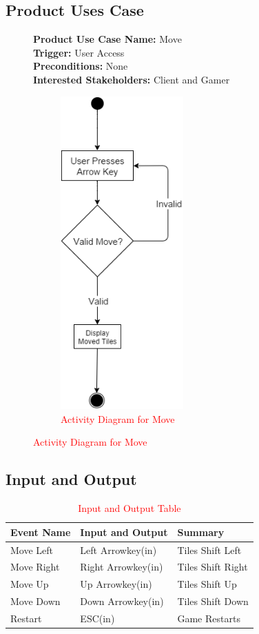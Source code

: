 \documentclass[12pt]{article}
\begin{document}
\subsection{\color{red}Product Uses Case}
\begin{figure}[H]%
    \color{red}
	\textbf{Product Use Case Name:} Move\\
	\textbf{Trigger:} User Access\\
	\textbf{Preconditions: } None\\
	\textbf{Interested Stakeholders: } Client and Gamer\\
	\begin{figure}[H]%
		\color{red}
		\centering
		\includegraphics[height = 12cm]{activity_diagram}
		\caption{\textcolor{red}{Activity Diagram for Move}}
		\label{Activity Diagram for Move}
	\end{figure}
\end{figure}

\subsection{\color{red}Input and Output}
\begin{table}[H]
    \color{red}
	\centering
	\begin{tabular}{ | p{5cm} |  p{5cm} | p{5cm} |}\hline
        \textbf{Event Name} & \textbf{Input and Output} & \textbf{Summary} \\\hline
        Move Left & Left Arrowkey(in) & Tiles Shift Left \\\hline
        Move Right & Right Arrowkey(in) & Tiles Shift Right \\\hline
        Move Up & Up Arrowkey(in) & Tiles Shift Up \\\hline
        Move Down & Down Arrowkey(in) & Tiles Shift Down \\\hline
        Restart & ESC(in) & Game Restarts \\\hline
	\end{tabular}
	\caption{\textcolor{red}{Input and Output Table}}
\end{table}
\end{document}
